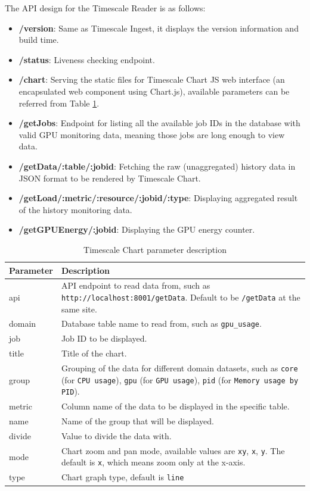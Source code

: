 The API design for the Timescale Reader is as follows:

\begin{itemize}
    \item \textbf{/version}: Same as Timescale Ingest, it displays the version information and build time.
    \item \textbf{/status}: Liveness checking endpoint.
    \item \textbf{/chart}: Serving the static files for Timescale Chart JS web interface (an encapsulated web component using Chart.js), available parameters can be referred from Table \ref{tab:chart_params}.
    \item \textbf{/getJobs}: Endpoint for listing all the available job IDs in the database with valid GPU monitoring data, meaning those jobs are long enough to view data.
    \item \textbf{/getData/:table/:jobid}: Fetching the raw (unaggregated) history data in JSON format to be rendered by Timescale Chart.
    \item \textbf{/getLoad/:metric/:resource/:jobid/:type}: Displaying aggregated result of the history monitoring data.
    \item \textbf{/getGPUEnergy/:jobid}: Displaying the GPU energy counter.
\end{itemize}


\begin{table}[H]
\centering
\caption{Timescale Chart parameter description}
\begin{tabular}{|l|p{10cm}|}
\hline
\textbf{Parameter} & \textbf{Description} \\ \hline
api & API endpoint to read data from, such as \texttt{http://localhost:8001/getData}. Default to be \texttt{/getData} at the same site. \\ \hline
domain & Database table name to read from, such as \texttt{gpu\_usage}. \\ \hline
job & Job ID to be displayed. \\ \hline
title & Title of the chart. \\ \hline
group & Grouping of the data for different domain datasets, such as \texttt{core} (for \texttt{CPU usage}), \texttt{gpu} (for \texttt{GPU usage}), \texttt{pid} (for \texttt{Memory usage by PID}). \\ \hline
metric & Column name of the data to be displayed in the specific table. \\ \hline
name & Name of the group that will be displayed. \\ \hline
divide & Value to divide the data with. \\ \hline
mode & Chart zoom and pan mode, available values are \texttt{xy}, \texttt{x}, \texttt{y}. The default is \texttt{x}, which means zoom only at the x-axis. \\ \hline
type & Chart graph type, default is \texttt{line} \\ \hline
\end{tabular}
\label{tab:chart_params}
\end{table}

